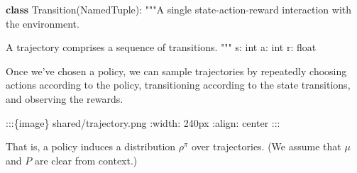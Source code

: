 \documentclass[
  letterpaper,
  DIV=11,
  numbers=noendperiod]{scrreprt}
\newenvironment{Shaded}{\begin{snugshade}}{\end{snugshade}}
\newcommand{\BuiltInTok}[1]{\textcolor[rgb]{0.00,0.23,0.31}{#1}}
\newcommand{\CommentTok}[1]{\textcolor[rgb]{0.37,0.37,0.37}{#1}}
\newcommand{\KeywordTok}[1]{\textcolor[rgb]{0.00,0.23,0.31}{\textbf{#1}}}
\newcommand{\NormalTok}[1]{\textcolor[rgb]{0.00,0.23,0.31}{#1}}
\theoremstyle{plain}
\theoremstyle{plain}
\theoremstyle{definition}
\theoremstyle{definition}
\theoremstyle{remark}
\begin{document}
\begin{Shaded}
\begin{Highlighting}[]
\KeywordTok{class}\NormalTok{ Transition(NamedTuple):}
    \CommentTok{"""A single state{-}action{-}reward interaction with the environment.}

\CommentTok{    A trajectory comprises a sequence of transitions.}
\CommentTok{    """}
\NormalTok{    s: }\BuiltInTok{int}
\NormalTok{    a: }\BuiltInTok{int}
\NormalTok{    r: }\BuiltInTok{float}
\end{Highlighting}
\end{Shaded}

Once we've chosen a policy, we can sample trajectories by repeatedly
choosing actions according to the policy, transitioning according to the
state transitions, and observing the rewards.

:::\{image\} shared/trajectory.png :width: 240px :align: center :::

That is, a policy induces a distribution \(\rho^{\pi}\) over
trajectories. (We assume that \(\mu\) and \(P\) are clear from context.)
\end{document}

